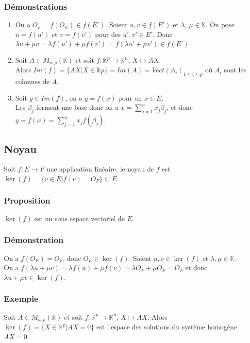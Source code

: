\documentclass[a4paper,10pt]{book} %
\newcommand{\K}{\mathbb{K}}
\begin{document}
\subsubsection{Démonstrations}
\begin{enumerate}
\item On a $O_F=f(O_E)\in f(E')$. Soient $u,v\in f(E')$ et $\lambda$, $\mu \in \K$. On pose $u=f(u')$ et $v=f(v')$ pour des $u',v'\in E'$. Donc $\lambda u+\mu v=\lambda f(u')+\mu f(v')=f(\lambda u'+\mu v')\in f(E')$.\\

\item Soit $A \in M_{n,p}(\K)$ et soit $f: \K^p\rightarrow \K^n$, $X\mapsto AX$. \\
Alors $Im(f)=\{AX|X\in \K p\}=Im(A)=Vect(A_i)_{1\leq i \leq p}$ où $A_i$ sont les colonnes de $A$.\\

\item Soit $y \in Im(f)$, on a $y=f(x)$ pour un $x \in E$.\\
Les $\beta_j$ forment une base donc on a $\displaystyle x=\sum\limits_{j=1}^nx_j\beta_j$, et donc $\displaystyle y=f(x)=\sum\limits_{j=1}^n x_j f(\beta_j)$.
\end{enumerate}

\subsection{Noyau}
Soit $f:E\rightarrow F$ une application linéaire, le noyau de $f$ est $\ker(f)=\{ v\in E | f(v)=O_F \} \subseteq E$.

\subsubsection{Proposition}
$\ker(f)$ est un sous espace vectoriel de $E$.

\subsubsection{Démonstration}
On a $f(O_E)=O_F$, donc $O_E \in \ker(f)$. Soient $u,v \in \ker(f)$ et $\lambda, \mu \in \K$.\\
On a $f(\lambda u + \mu v)=\lambda f(u)+\mu f(v)=\lambda O_F +\mu O_F=O_F$ et donc $\lambda u+\mu v\in \ker(f)$.

\subsubsection{Exemple}
Soit $A \in M_{n,p}(\K)$ et soit $f: \K^p \rightarrow \K^n$, $X\mapsto AX$.
Alors $\ker(f)=\{ X\in \K^p | AX=0 \}$ est l'espace des solutions du système homogène $AX=0$.
\end{document}
